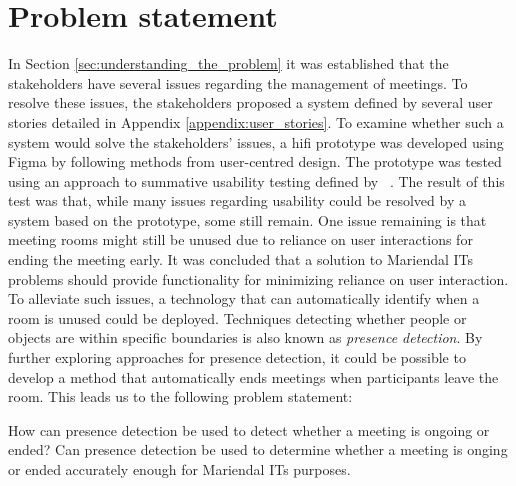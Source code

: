 \section{Problem statement}\label{sec:problem_statement}
In Section \ref{sec:understanding_the_problem} it was established that the stakeholders have several issues regarding the management of meetings. 
To resolve these issues, the stakeholders proposed a system defined by several user stories detailed in Appendix \ref{appendix:user_stories}. 
To examine whether such a system would solve the stakeholders' issues, a hifi prototype was developed using Figma\cite{Figma} by following methods from user-centred design.
The prototype was tested using an approach to summative usability testing defined by \citeauthor{lazar2005web}~\cite{lazar2005web}. 
The result of this test was that, while many issues regarding usability could be resolved by a system based on the prototype, some still remain. 
One issue remaining is that meeting rooms might still be unused due to reliance on user interactions for ending the meeting early.
It was concluded that a solution to Mariendal ITs problems should provide functionality for minimizing reliance on user interaction.
To alleviate such issues, a technology that can automatically identify when a room is unused could be deployed. 
Techniques detecting whether people or objects are within specific boundaries is also known as \textit{presence detection}.
By further exploring approaches for presence detection, it could be possible to develop a method that automatically ends meetings when participants leave the room.
This leads us to the following problem statement:
\begin{problem_statement}
    How can presence detection be used to detect whether a meeting is ongoing or ended?
    Can presence detection be used to determine whether a meeting is onging or ended accurately enough for Mariendal ITs purposes.  
\end{problem_statement}

